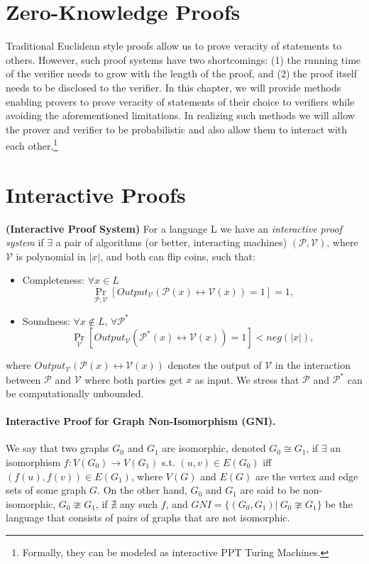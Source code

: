 \section{Zero-Knowledge Proofs}
Traditional Euclidean style proofs allow us to prove veracity of statements to others. However, such proof systems have two shortcomings: (1) the running time of the verifier needs to grow with the length of the proof, and (2) the proof itself needs to be disclosed to the verifier. In this chapter, we will provide methods enabling provers to prove veracity of statements of their choice to verifiers while avoiding the aforementioned limitations. In realizing such methods we will allow the prover and verifier to be probabilistic and also allow them to interact with each other.\footnote{Formally, they can be modeled as interactive PPT Turing Machines.}

\section{Interactive Proofs}
\begin{definition} {\normalfont\textbf{(Interactive Proof System)}} For a language L we have an \textit{interactive proof system} if $\exists$ a pair of algorithms (or better, interacting machines) $(\mathcal{P},\mathcal{V})$, where $\mathcal{V}$ is polynomial in $|x|$, and both can flip coins, such that:
		\begin{itemize}
			\item Completeness: $\forall x\in L$
		$$\Pr_{\mathcal{P},\mathcal{V}} \left[Output_{\mathcal{V}}(\mathcal{P}(x) \leftrightarrow \mathcal{V}(x))=1\right]=1,$$
			\item Soundness: $\forall x\notin L$, $\forall \mathcal{P}^*$
		$$\Pr_{\mathcal{V}} \left[Output_{\mathcal{V}}(\mathcal{P}^*(x) \leftrightarrow \mathcal{V}(x))=1\right]<neg(|x|),$$
		\end{itemize} where $Output_{\mathcal{V}}(\mathcal{P}(x) \leftrightarrow \mathcal{V}(x))$ denotes the output of $\mathcal{V}$ in the interaction between $\mathcal{P}$ and $\mathcal{V}$ where both parties get $x$ as input.
		We stress that $\mathcal{P}$ and $\mathcal{P}^*$ can be computationally unbounded. 
  \end{definition}



\paragraph{Interactive Proof for Graph Non-Isomorphism (GNI).} We say that two graphs $G_0$ and $G_1$ are isomorphic, denoted $G_0 \cong G_1$, if $\exists$ an isomorphism $f: V(G_0) \rightarrow V(G_1)$ s.t. $(u,v)\in E(G_0)$ iff $(f(u),f(v))\in E(G_1)$, where $V(G)$ and $E(G)$ are the vertex and edge sets of some graph $G$. On the other hand, $G_0$ and $G_1$ are said to be non-isomorphic, $G_0 \ncong G_1$, if $\nexists$ any such $f$, and $GNI=\lbrace(G_0,G_1)|\  G_0\ncong G_1\rbrace$ be the language that consists of pairs of graphs that are not isomorphic. 

